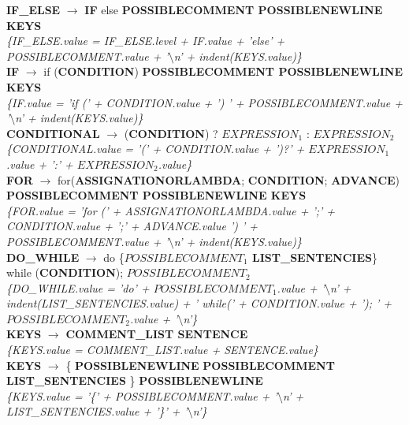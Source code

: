 \documentclass[10pt,a4paper]{article}
\begin{document}
\textbf{IF\_ELSE} $\rightarrow$ \textbf{IF} else \textbf{POSSIBLECOMMENT POSSIBLENEWLINE KEYS} \\
\textit{\{IF\_ELSE.value = IF\_ELSE.level + IF.value + 'else' + POSSIBLECOMMENT.value + '$\setminus$n' + indent(KEYS.value)\}} \\

\textbf{IF} $\rightarrow$ if (\textbf{CONDITION}) \textbf{POSSIBLECOMMENT POSSIBLENEWLINE KEYS} \\
\textit{\{IF.value = 'if (' + CONDITION.value + ') ' + POSSIBLECOMMENT.value + '$\setminus$n' + indent(KEYS.value)\}} \\

\textbf{CONDITIONAL} $\rightarrow$ (\textbf{CONDITION}) ? \textbf{$EXPRESSION_{1}$} : \textbf{$EXPRESSION_{2}$}  \\
\textit{\{CONDITIONAL.value = '(' + CONDITION.value + ')?' + $EXPRESSION_{1}$.value + ':' + $EXPRESSION_{2}$.value\}}\\
	
\textbf{FOR} $\rightarrow$ for(\textbf{ASSIGNATIONORLAMBDA}; \textbf{CONDITION}; \textbf{ADVANCE}) \textbf{POSSIBLECOMMENT POSSIBLENEWLINE KEYS}  \\
\textit{\{FOR.value = 'for (' + ASSIGNATIONORLAMBDA.value + ';' + CONDITION.value + ';' + ADVANCE.value ') ' + POSSIBLECOMMENT.value + '$\setminus$n' + indent(KEYS.value)\}}\\

\textbf{DO\_WHILE} $\rightarrow$ do \{\textbf{$POSSIBLECOMMENT_{1}$ LIST\_SENTENCIES}\} while (\textbf{CONDITION}); \textbf{$POSSIBLECOMMENT_{2}$} \\
\textit{\{DO\_WHILE.value = 'do{' + $POSSIBLECOMMENT_{1}$.value + '$\setminus$n' + indent(LIST\_SENTENCIES.value) + '} while(' + CONDITION.value + '); ' + $POSSIBLECOMMENT_{2}$.value + '$\setminus$n'\}}\\

\textbf{KEYS} $\rightarrow$ \textbf{COMMENT\_LIST SENTENCE} \\ 
\textit{\{KEYS.value = COMMENT\_LIST.value + SENTENCE.value\}} \\

\textbf{KEYS} $\rightarrow$ \{  \textbf{POSSIBLENEWLINE} \textbf{POSSIBLECOMMENT} \textbf{LIST\_SENTENCIES} \} \textbf{POSSIBLENEWLINE}  \\
\textit{\{KEYS.value = '\{' + POSSIBLECOMMENT.value + '$\setminus$n' + LIST\_SENTENCIES.value + '\}' + '$\setminus$n'\}} \\
\end{document}

